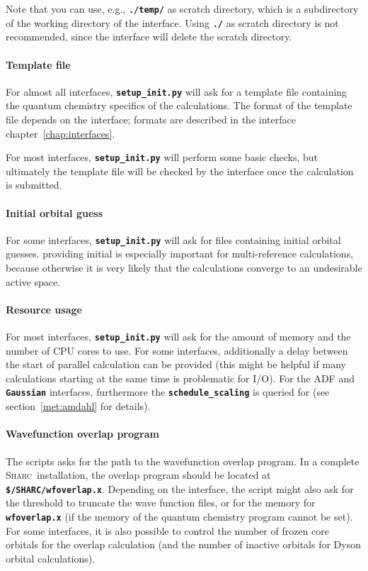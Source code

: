 \documentclass[a4paper,10pt,DIV=15,openany,twoside=false]{scrbook}
\newcommand{\sharc}{\textsc{Sharc}}
\newcommand{\ttt}[1]{\textbf{\texttt{#1}}}
\begin{document}
Note that you can use, e.g., \ttt{./temp/} as scratch directory, which is a subdirectory of the working directory of the interface. Using \ttt{./} as scratch directory is not recommended, since the interface will delete the scratch directory.

\paragraph{Template file}

For almost all interfaces, \ttt{setup\_init.py} will ask for a template file containing the quantum chemistry specifics of the calculations. The format of the template file depends on the interface; formats are described in the interface chapter~\ref{chap:interfaces}.

For most interfaces, \ttt{setup\_init.py} will perform some basic checks, but ultimately the template file will be checked by the interface once the calculation is submitted.

\paragraph{Initial orbital guess}

For some interfaces, \ttt{setup\_init.py} will ask for files containing initial orbital guesses. providing initial is especially important for multi-reference calculations, because otherwise it is very likely that the calculations converge to an undesirable active space.

\paragraph{Resource usage}

For most interfaces, \ttt{setup\_init.py} will ask for the amount of memory and the number of CPU cores to use. For some interfaces, additionally a delay between the start of parallel calculation can be provided (this might be helpful if many calculations starting at the same time is problematic for I/O).
For the ADF and \ttt{Gaussian} interfaces, furthermore the \ttt{schedule\_scaling} is queried for (see section~\ref{met:amdahl} for details).

\paragraph{Wavefunction overlap program}

The scripts asks for the path to the wavefunction overlap program. In a complete \sharc\ installation, the overlap program should be located at \ttt{\$/SHARC/wfoverlap.x}.
Depending on the interface, the script might also ask for the threshold to truncate the wave function files, or for the memory for \ttt{wfoverlap.x} (if the memory of the quantum chemistry program cannot be set).
For some interfaces, it is also possible to control the number of frozen core orbitals for the overlap calculation (and the number of inactive orbitals for Dyson orbital calculations).
\end{document}
